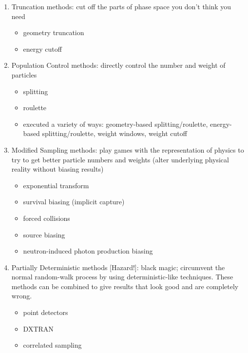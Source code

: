 \documentclass[12pt]{article}
\begin{document}
\begin{enumerate}
\item Truncation methods: cut off the parts of phase space you don't think you need
  \begin{itemize}
  \item geometry truncation
  \item energy cutoff
  \end{itemize}
  
\item Population Control methods: directly control the number and weight of particles
  \begin{itemize}
  \item splitting
  \item roulette
  \item executed a variety of ways: geometry-based splitting/roulette, energy-based splitting/roulette, weight windows, weight cutoff
  \end{itemize}

\item Modified Sampling methods: play games with the representation of physics to try to get better particle numbers and weights (alter underlying physical reality without biasing results)
  \begin{itemize}
  \item exponential transform
  \item survival biasing (implicit capture)
  \item forced collisions
  \item source biasing
  \item neutron-induced photon production biasing
  \end{itemize}

\item Partially Deterministic methods [Hazard!]: black magic; circumvent the normal random-walk process by using deterministic-like techniques. These methods can be combined to give results that look good and are completely wrong.
  \begin{itemize}
  \item point detectors
  \item DXTRAN
  \item correlated sampling
  \end{itemize}
\end{enumerate}
\end{document}
